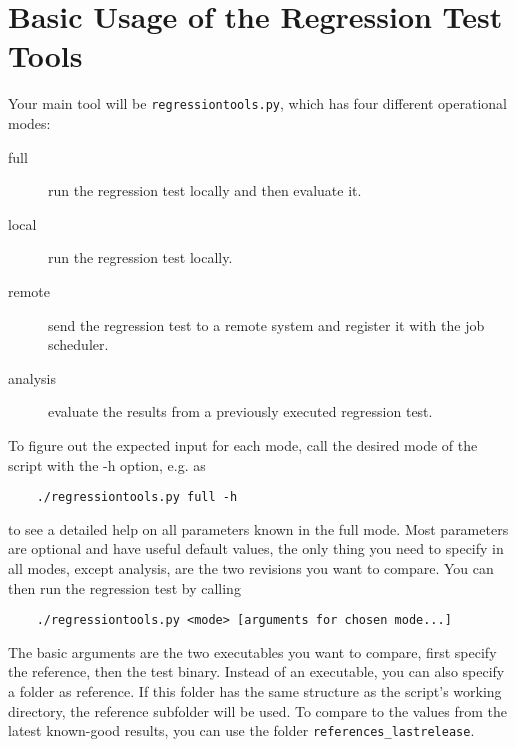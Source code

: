 \documentclass[a4paper,12pt]{scrartcl}
\begin{document}
\section{Basic Usage of the Regression Test Tools}
Your main tool will be \texttt{regressiontools.py}, which has four different operational modes:
\begin{description}
    \item[full] run the regression test locally and then evaluate it.
    \item[local] run the regression test locally.
    \item[remote] send the regression test to a remote system and register it with the job scheduler.
    \item[analysis] evaluate the results from a previously executed regression test.
\end{description}
To figure out the expected input for each mode, call the desired mode of the script with the -h option, e.g. as
\begin{verbatim}
    ./regressiontools.py full -h
\end{verbatim}
to see a detailed help on all parameters known in the full mode. Most parameters are optional and have useful default
values, the only thing you need to specify in all modes, except analysis, are the two revisions you want to compare.
You can then run the regression test by calling
\begin{verbatim}
    ./regressiontools.py <mode> [arguments for chosen mode...]
\end{verbatim}
The basic arguments are the two executables you want to compare, first specify the reference, then the test binary.
Instead of an executable, you can also specify a folder as reference. If this folder has the same structure as the
script's working directory, the reference subfolder will be used. To compare to the values from the latest known-good
results, you can use the folder \texttt{references\_lastrelease}.
\end{document}
